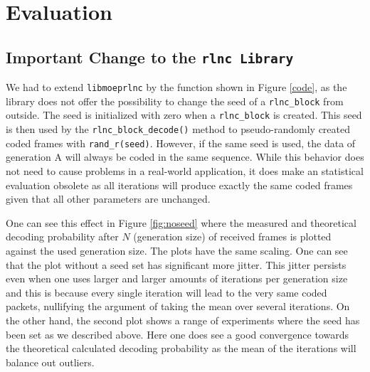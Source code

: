 \documentclass[a4paper,english,10pt]{tumarticle}
\begin{document}
\section{Evaluation}\label{sec:eval} \subsection{Important Change to the \texttt{rlnc Library}} We
had to extend \texttt{libmoeprlnc} by the function shown in Figure \ref{code}, as the library does
not offer the possibility to change the seed of a \texttt{rlnc\_block} from outside. The seed is
initialized with zero when a \texttt{rlnc\_block} is created. This seed is then used by the
\texttt{rlnc\_block\_decode()} method to pseudo-randomly created coded frames with
\texttt{rand\_r(seed)}. However, if the same seed is used, the data of generation A will always be
coded in the same sequence. While this behavior does not need to cause problems in a real-world
application, it does make an statistical evaluation obsolete as all iterations will produce exactly
the same coded frames given that all other parameters are unchanged.

One can see this effect in Figure \ref{fig:noseed} where the measured and theoretical decoding
probability after $N$ (generation size) of received frames is plotted against the used generation
size. The plots have the same scaling. One can see that the plot without a seed set has significant
more jitter. This jitter persists even when one uses larger and larger amounts of iterations per
generation size and this is because every single iteration will lead to the very same coded packets,
nullifying the argument of taking the mean over several iterations. On the other hand, the second
plot shows a range of experiments where the seed has been set as we described above. Here one does
see a good convergence towards the theoretical calculated decoding probability as the mean of the
iterations will balance out outliers.
\end{document}
